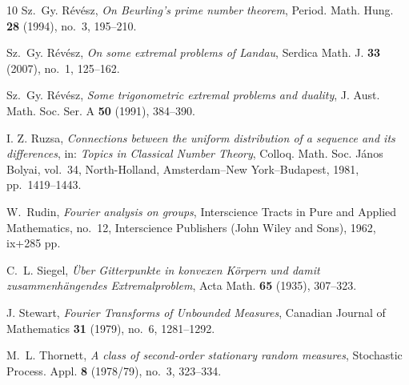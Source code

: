 \documentclass[[a4paper,english,12pt]{amsart}
\theoremstyle{plain}
\theoremstyle{remark}
\begin{document}
\begin{thebibliography}{10}
Sz.~Gy. R\'ev\'esz, \emph{On Beurling's prime number theorem}, Period. Math. Hung.
  \textbf{28} (1994), no.~3, 195--210.

Sz.~Gy. R\'ev\'esz, \emph{On some extremal problems of {L}andau}, Serdica Math. J.
  \textbf{33} (2007), no.~1, 125--162.


Sz.~Gy. R\'ev\'esz, \emph{Some trigonometric extremal problems and duality}, J.
  Aust. Math. Soc. Ser. A \textbf{50} (1991), 384--390.

I. Z. Ruzsa,
\emph{Connections between the uniform distribution of a sequence and its differences},
in: \emph{Topics in Classical Number Theory},
Colloq. Math. Soc. János Bolyai, vol.~34,
North-Holland, Amsterdam--New York--Budapest, 1981, pp.~1419--1443.


W.~Rudin, \emph{Fourier analysis on groups}, Interscience Tracts in Pure and
Applied Mathematics, no.~12, Interscience Publishers (John Wiley and Sons),
1962, ix+285 pp.

C.~L. Siegel, \emph{Über {G}itterpunkte in konvexen {K}örpern und damit
  zusammenhängendes {E}xtremalproblem}, Acta Math. \textbf{65} (1935), 307--323.


J. Stewart,
\emph{Fourier Transforms of Unbounded Measures},
Canadian Journal of Mathematics \textbf{31} (1979), no.~6, 1281--1292.


M.~L. Thornett, \emph{A class of second-order stationary random measures},
  Stochastic Process. Appl. \textbf{8} (1978/79), no.~3, 323--334.



\end{thebibliography}
\end{document}
